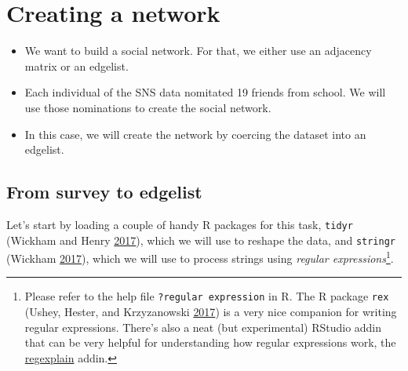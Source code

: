 \documentclass[]{book}
\newenvironment{Shaded}{\begin{snugshade}}{\end{snugshade}}
\newcommand{\KeywordTok}[1]{\textcolor[rgb]{0.13,0.29,0.53}{\textbf{#1}}}
\newcommand{\DataTypeTok}[1]{\textcolor[rgb]{0.13,0.29,0.53}{#1}}
\newcommand{\DecValTok}[1]{\textcolor[rgb]{0.00,0.00,0.81}{#1}}
\newcommand{\StringTok}[1]{\textcolor[rgb]{0.31,0.60,0.02}{#1}}
\newcommand{\OperatorTok}[1]{\textcolor[rgb]{0.81,0.36,0.00}{\textbf{#1}}}
\newcommand{\NormalTok}[1]{#1}
\let\rmarkdownfootnote\footnote%
\def\footnote{\protect\rmarkdownfootnote}
\theoremstyle{definition}
\theoremstyle{definition}
\theoremstyle{definition}
\theoremstyle{remark}
\begin{document}
\begin{Shaded}
\end{Shaded}

\section{Creating a network}\label{creating-a-network}

\begin{itemize}
\item
  We want to build a social network. For that, we either use an
  adjacency matrix or an edgelist.
\item
  Each individual of the SNS data nomitated 19 friends from school. We
  will use those nominations to create the social network.
\item
  In this case, we will create the network by coercing the dataset into
  an edgelist.
\end{itemize}

\subsection{From survey to edgelist}\label{from-survey-to-edgelist}

Let's start by loading a couple of handy R packages for this task,
\texttt{tidyr} (Wickham and Henry
\protect\hyperlink{ref-R-tidyr}{2017}), which we will use to reshape the
data, and \texttt{stringr} (Wickham
\protect\hyperlink{ref-R-stringr}{2017}), which we will use to process
strings using \emph{regular expressions}\footnote{Please refer to the
  help file
  \texttt{?\textquotesingle{}regular\ expression\textquotesingle{}} in
  R. The R package \texttt{rex} (Ushey, Hester, and Krzyzanowski
  \protect\hyperlink{ref-R-rex}{2017}) is a very nice companion for
  writing regular expressions. There's also a neat (but experimental)
  RStudio addin that can be very helpful for understanding how regular
  expressions work, the
  \href{https://github.com/gadenbuie/regexplain}{regexplain} addin.}.
\end{document}
